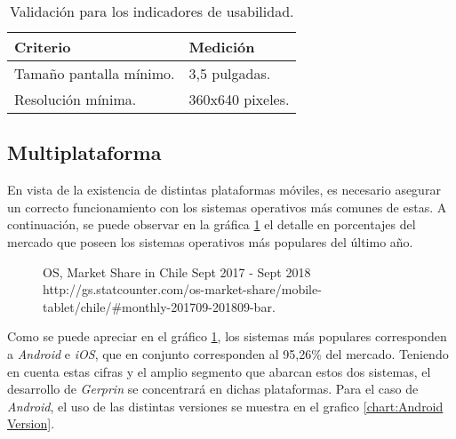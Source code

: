 \begin{table}[H]
    \caption[Validación para los indicadores de usabilidad.] {Validación para los indicadores de usabilidad.}
    \label{tbl:Criterios de Validación usabilidad}
    \begin{tabular}{|p{}|p{}|}
        \hline
        \textbf{Criterio} &  \textbf{Medición}\\
    	\hline
    	\hline
    	Tamaño pantalla mínimo. & 3,5 pulgadas. \\ \hline
		Resolución mínima.  & 360x640 pixeles. \\ 
        \hline
    \end{tabular}
\end{table}

\subsection{Multiplataforma}

En vista de la existencia de distintas plataformas móviles, es necesario asegurar un correcto funcionamiento con los sistemas operativos más comunes de estas. A continuación, se puede observar en la gráfica \ref{chart:OS} el detalle en porcentajes del mercado que poseen los sistemas operativos más populares del último año.

\begin{figure}[H]
	\centering
	\caption[OS, Market Share in Chile Sept 2017 - Sept 2018.]{OS, Market Share in Chile Sept 2017 - Sept 2018 \\ http://gs.statcounter.com/os-market-share/mobile-tablet/chile/\#monthly-201709-201809-bar.}
	\label{chart:OS}
	\begin{bchart}[step=10, max=100, width=.8\textwidth, unit=\%]
	\end{bchart}
\end{figure}

Como se puede apreciar en el gráfico \ref{chart:OS}, los sistemas más populares corresponden a \emph{Android} e \emph{iOS}, que en conjunto corresponden al 95,26\% del mercado. Teniendo en cuenta estas cifras y el amplio segmento que abarcan estos dos sistemas, el desarrollo de \emph{Gerprin} se concentrará en dichas plataformas. Para el caso de \emph{Android}, el uso de las distintas versiones se muestra en el grafico \ref{chart:Android Version}.

